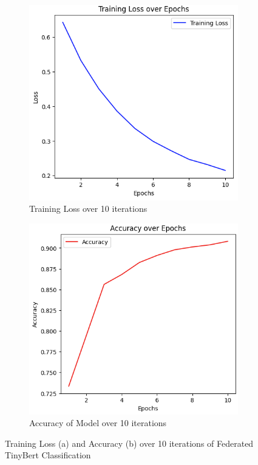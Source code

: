 \documentclass[11pt]{article}
\begin{document}
\begin{figure}[h]
    \centering
    \begin{subfigure}[b]{0.42\textwidth}
        \centering
        \includegraphics[width=\textwidth]{images/results3.png}
        \caption{Training Loss over 10 iterations}
        \label{fig:loss-2} %
    \end{subfigure}
    \hfill
    \begin{subfigure}[b]{0.43\textwidth}
        \centering
        \includegraphics[width=\textwidth]{images/results4.png}
        \caption{Accuracy of Model over 10 iterations}
        \label{fig:accuracy-2}
    \end{subfigure}
    
    \caption{Training Loss (a) and Accuracy (b) over 10 iterations of Federated TinyBert Classification}
    \label{fig:results-2}
\end{figure}
\end{document}
